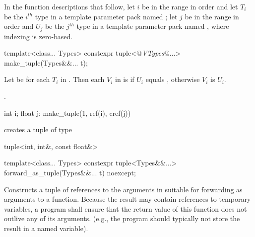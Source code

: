 \pnum
In the function descriptions that follow, let $i$ be in the range 
in order and let $T_i$ be the $i^{th}$ type in a template parameter pack named ;
let $j$ be in the range  in order and $U_j$ be the $j^{th}$ type
in a template parameter pack named , where indexing is zero-based.

%
%
\begin{itemdecl}
template<class... Types>
  constexpr tuple<@\textit{VTypes}@...> make_tuple(Types&&... t);
\end{itemdecl}

\begin{itemdescr} \pnum Let  be  for each
$T_i$ in . Then each $V_i$ in  is
 if $U_i$ equals , otherwise
$V_i$ is $U_i$.

\pnum
\returns {}.

\pnum
\enterexample

\begin{codeblock}
int i; float j;
make_tuple(1, ref(i), cref(j))
\end{codeblock}

creates a tuple of type

\begin{codeblock}
tuple<int, int&, const float&>
\end{codeblock}

\exitexample

\end{itemdescr}

%
%
\begin{itemdecl}
template<class... Types>
  constexpr tuple<Types&&...> forward_as_tuple(Types&&... t) noexcept;
\end{itemdecl}

\begin{itemdescr}
\pnum
\effects Constructs a tuple of references to the arguments in  suitable
for forwarding as arguments to a function. Because the result may contain references
to temporary variables, a program shall ensure that the return value of this
function does not outlive any of its arguments. (e.g., the program should typically
not store the result in a named variable).

\pnum
\returns {}
\end{itemdescr}

